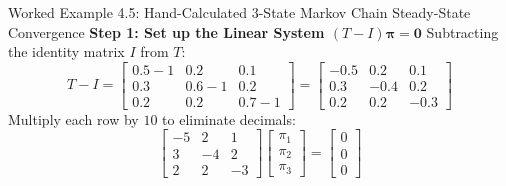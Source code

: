\begin{examplebox}{Worked Example 4.5: Hand-Calculated 3-State Markov Chain Steady-State Convergence}
\textbf{Step 1: Set up the Linear System $(T - I)\boldsymbol{\pi} = \mathbf{0}$}
Subtracting the identity matrix $I$ from $T$:
\begin{equation*}
T - I = \begin{bmatrix}
0.5 - 1 & 0.2 & 0.1 \\
0.3 & 0.6 - 1 & 0.2 \\
0.2 & 0.2 & 0.7 - 1
\end{bmatrix} = \begin{bmatrix}
-0.5 & 0.2 & 0.1 \\
0.3 & -0.4 & 0.2 \\
0.2 & 0.2 & -0.3
\end{bmatrix}
\end{equation*}
Multiply each row by $10$ to eliminate decimals:
\begin{equation*}
\begin{bmatrix}
-5 & 2 & 1 \\
3 & -4 & 2 \\
2 & 2 & -3
\end{bmatrix} \begin{bmatrix} \pi_1 \\ \pi_2 \\ \pi_3 \end{bmatrix} = \begin{bmatrix} 0 \\ 0 \\ 0 \end{bmatrix}
\end{equation*}


\end{examplebox}
